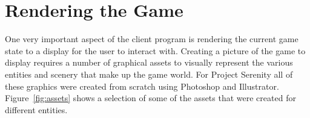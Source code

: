 \section{Rendering the Game}


% 
% 
% 
% 



% 

One very important aspect of the client program is rendering the current game state to a display for the user to interact with. Creating a picture of the game to display requires a number of graphical assets to visually represent the various entities and scenery that make up the game world. For Project Serenity all of these graphics were created from scratch using Photoshop and Illustrator. Figure~\ref{fig:assets} shows a selection of some of the assets that were created for different entities.

